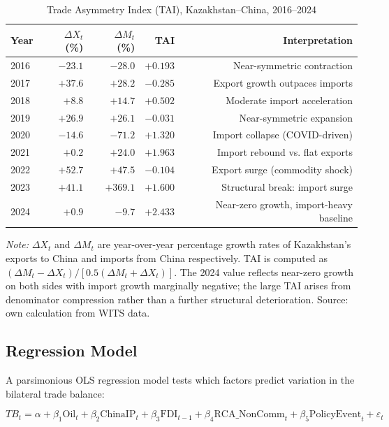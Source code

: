\documentclass[12pt]{article}
\begin{document}
\begin{table}[H]
\centering
\small
\caption{Trade Asymmetry Index (TAI), Kazakhstan--China, 2016--2024}
\label{tab:tai_annual}
\begin{tabular}{lrrrr}
\toprule
Year & $\Delta X_{t}$ (\%) & $\Delta M_{t}$ (\%) & TAI & Interpretation \\
\midrule
2016 & $-23.1$ & $-28.0$ & $+0.193$ & Near-symmetric contraction \\
2017 & $+37.6$ & $+28.2$ & $-0.285$ & Export growth outpaces imports \\
2018 & $+8.8$  & $+14.7$ & $+0.502$ & Moderate import acceleration \\
2019 & $+26.9$ & $+26.1$ & $-0.031$ & Near-symmetric expansion \\
2020 & $-14.6$ & $-71.2$ & $+1.320$ & Import collapse (COVID-driven) \\
2021 & $+0.2$  & $+24.0$ & $+1.963$ & Import rebound vs. flat exports \\
2022 & $+52.7$ & $+47.5$ & $-0.104$ & Export surge (commodity shock) \\
2023 & $+41.1$ & $+369.1$& $+1.600$ & Structural break: import surge \\
2024 & $+0.9$  & $-9.7$  & $+2.433$ & Near-zero growth, import-heavy baseline \\
\bottomrule
\end{tabular}
\footnotesize

\emph{Note:} $\Delta X_t$ and $\Delta M_t$ are year-over-year percentage growth rates of Kazakhstan's exports to China and imports from China respectively. TAI is computed as $(\Delta M_t - \Delta X_t) / [0.5(\Delta M_t + \Delta X_t)]$. The 2024 value reflects near-zero growth on both sides with import growth marginally negative; the large TAI arises from denominator compression rather than a further structural deterioration. Source: own calculation from WITS data.\end{table}

\subsection{Regression Model}

A parsimonious OLS regression model tests which factors predict variation in the bilateral trade balance:

\begin{equation}
TB_t = \alpha + \beta_1 \text{Oil}_t + \beta_2 \text{ChinaIP}_t + \beta_3 \text{FDI}_{t-1} + \beta_4 \text{RCA\_NonComm}_t + \beta_5 \text{PolicyEvent}_t + \varepsilon_t
\end{equation}
\end{document}
